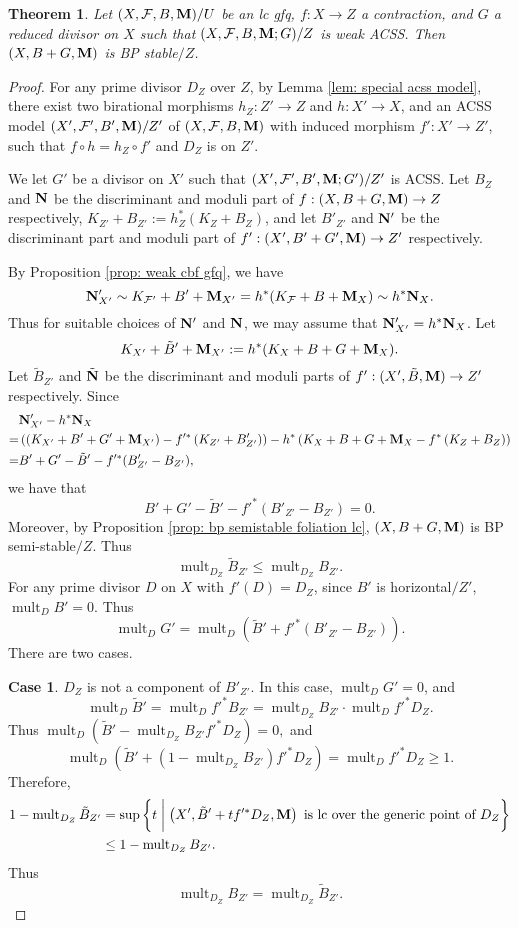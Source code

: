\documentclass[11pt]{amsart}
\numberwithin{equation}{section}
\newcommand{\Mm}{{\bf{M}}}
\newcommand{\Nn}{{\bf{N}}}
\newcommand{\mult}{\operatorname{mult}}
\newcommand{\Ff}{\mathcal{F}}
\newtheorem{thm}{Theorem}[subsection]
\theoremstyle{definition}
\theoremstyle{definition}
\theoremstyle{definition}
\begin{document}
\begin{thm}\label{thm: lc+weak acc=bpstable}
    Let $(X,\Ff,B,\Mm)/U$ be an lc gfq, $f: X\rightarrow Z$ a contraction, and $G$ a reduced divisor on $X$ such that $(X,\Ff,B,\Mm;G)/Z$ is weak ACSS. Then $(X,B+G,\Mm)$ is BP stable$/Z$.
\end{thm}
\begin{proof}
For any prime divisor $D_Z$ over $Z$, by Lemma \ref{lem: special acss model}, there exist two birational morphisms $h_Z: Z'\rightarrow Z$ and $h: X'\rightarrow X$, and an ACSS model $(X',\Ff',B',\Mm)/Z'$ of $(X,\Ff,B,\Mm)$ with induced morphism $f': X'\rightarrow Z'$, such that $f\circ h=h_Z\circ f'$ and $D_Z$ is on $Z'$. 

We let $G'$ be a divisor on $X'$ such that $(X',\Ff',B',\Mm;G')/Z'$ is ACSS. Let $B_Z$ and $\Nn$ be the discriminant and moduli part of $f: (X,B+G,\Mm)\rightarrow Z$ respectively, $K_{Z'}+B_{Z'}:=h_Z^*(K_Z+B_Z)$, and let $B'_{Z'}$ and $\Nn'$ be the discriminant part and moduli part of $f': (X',B'+G',\Mm)\rightarrow Z'$ respectively. 

By Proposition \ref{prop: weak cbf gfq}, we have
$$\Nn'_{X'}\sim K_{\Ff'}+B'+\Mm_{X'}=h^*(K_{\Ff}+B+\Mm_X)\sim h^*\Nn_X.$$
Thus for suitable choices of $\Nn'$ and $\Nn$, we may assume that $\Nn'_{X'}=h^*\Nn_X$. Let
$$K_{X'}+\tilde B'+\Mm_{X'}:=h^*(K_X+B+G+\Mm_X).$$
Let $\tilde B_{Z'}$ and $\tilde\Nn$ be the discriminant and moduli parts of $f': (X',\tilde B,\Mm)\rightarrow Z'$ respectively. Since
\begin{align*}
    &\Nn'_{X'}-h^*\Nn_X\\
    =&\left(\left(K_{X'}+B'+G'+\Mm_{X'}\right)-f'^*\left(K_{Z'}+B'_{Z'}\right)\right)-h^*\left(K_X+B+G+\Mm_X-f^*\left(K_Z+B_Z\right)\right)\\
    =&B'+G'-\tilde B'-f'^*(B'_{Z'}-B_{Z'}),
\end{align*}
we have that 
$$B'+G'-\tilde B'-f'^*(B'_{Z'}-B_{Z'})=0.$$ Moreover, by Proposition \ref{prop: bp semistable foliation lc}, $(X,B+G,\Mm)$ is BP semi-stable$/Z$. Thus $$\mult_{D_Z}\tilde B_{Z'}\leq\mult_{D_Z}B_{Z'}.$$ 
For any prime divisor $D$ on $X$ with $f'(D)=D_Z$, since $B'$ is horizontal$/Z'$, $\mult_DB'=0$. Thus
$$\mult_DG'=\mult_D\left(\tilde B'+f'^*\left(B'_{Z'}-B_{Z'}\right)\right).$$
There are two cases.

\medskip

\noindent\textbf{Case 1}. $D_Z$ is  not a component of $B'_{Z'}$. In this case, $\mult_DG'=0$, and
$$\mult_D\tilde B'=\mult_Df'^*B_{Z'}=\mult_{D_Z}B_{Z'}\cdot\mult_Df'^*D_Z.$$
Thus $\mult_D\left(\tilde B'-\mult_{D_Z}B_{Z'}f'^*D_Z\right)=0,$ and
$$\mult_D\left(\tilde B'+(1-\mult_{D_Z}B_{Z'})f'^*D_Z\right)=\mult_Df'^*D_Z\geq 1.$$
Therefore,
\begin{align*}
1-\mult_{D_Z}\tilde B_{Z'}&=\sup\left\{t\biggm| \left(X',\tilde B'+tf'^*D_Z,\Mm\right)\text{ is lc over the generic point of }D_Z\right\}\\
&\leq 1-\mult_{D_Z}B_{Z'}.
\end{align*}
Thus
$$\mult_{D_Z}B_{Z'}=\mult_{D_Z}\tilde B_{Z'}.$$


\end{proof}
\end{document}
